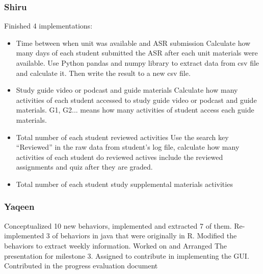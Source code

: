 \documentclass[12pt]{article}
\begin{document}
	\subsubsection{Shiru}
	Finished 4 implementations:
	\begin{itemize}
		\item Time between when unit was available and ASR submission
Calculate how many days of each student submitted the ASR after each unit materials were available. Use Python pandas and numpy library to extract data from csv file and calculate it. Then write the result to a new csv file.
		\item Study guide video or podcast and guide materials
Calculate how many activities of each student accessed to study guide video or podcast and guide materials. G1, G2... means how many activities of student access each guide materials.
		\item Total number of each student reviewed activities
Use the search key “Reviewed” in the raw data from student’s log file, calculate how many activities of each student do reviewed actives include the reviewed assignments and quiz after they are graded.
		\item Total number of each student study supplemental materials activities
	\end{itemize}

	\subsubsection{Yaqeen}
	
	Conceptualized 10 new behaviors, implemented and extracted 7 of them. Re-implemented 3 of behaviors in java that were originally in R. Modified the behaviors to extract weekly information. Worked on and Arranged The presentation for milestone 3. Assigned to contribute in implementing the GUI. Contributed in the progress evaluation document
	
\end{document}

